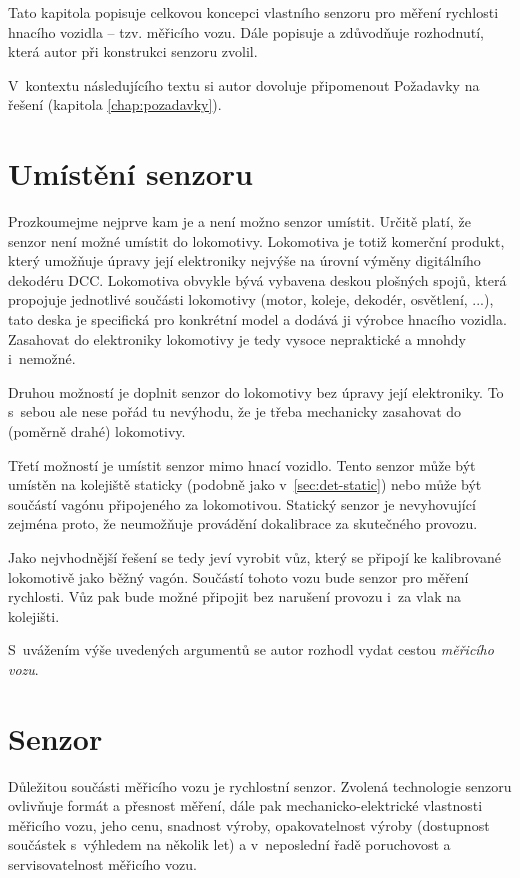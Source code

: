 Tato kapitola popisuje celkovou koncepci vlastního senzoru pro měření
rychlosti hnacího vozidla -- tzv. měřicího vozu. Dále popisuje
a zdůvodňuje rozhodnutí, která autor při konstrukci senzoru zvolil.

V~kontextu následujícího textu si autor dovoluje připomenout Požadavky
na řešení (kapitola \ref{chap:pozadavky}).

\section{Umístění senzoru}
\label{sec:wsm-senzor-umisteni}

Prozkoumejme nejprve kam je a není možno senzor umístit. Určitě platí, že
senzor není možné umístit do lokomotivy. Lokomotiva je totiž komerční produkt,
který umožňuje úpravy její elektroniky nejvýše na úrovní výměny digitálního
dekodéru DCC. Lokomotiva obvykle bývá vybavena deskou plošných spojů, která
propojuje jednotlivé součásti lokomotivy (motor, koleje, dekodér, osvětlení,
...), tato deska je specifická pro konkrétní model a dodává ji výrobce hnacího
vozidla. Zasahovat do elektroniky lokomotivy je tedy vysoce nepraktické a
mnohdy i~nemožné.

Druhou možností je doplnit senzor do lokomotivy bez úpravy její elektroniky.
To s~sebou ale nese pořád tu nevýhodu, že je třeba mechanicky zasahovat do
(poměrně drahé) lokomotivy.

Třetí možností je umístit senzor mimo hnací vozidlo. Tento senzor může být
umístěn na kolejiště staticky (podobně jako v~\ref{sec:det-static}) nebo může
být součástí vagónu připojeného za lokomotivou. Statický senzor je nevyhovující
zejména proto, že neumožňuje provádění dokalibrace za skutečného provozu.

Jako nejvhodnější řešení se tedy jeví vyrobit vůz, který se připojí ke kalibrované
lokomotivě jako běžný vagón. Součástí tohoto vozu bude senzor pro měření
rychlosti. Vůz pak bude možné připojit bez narušení provozu i~za vlak na
 kolejišti.

S~uvážením výše uvedených argumentů se autor rozhodl vydat cestou
\textit{měřicího vozu}.

\section{Senzor}
\label{sec:wsm-senzor}

Důležitou součásti měřicího vozu je rychlostní senzor. Zvolená technologie
senzoru ovlivňuje formát a přesnost měření, dále pak mechanicko-elektrické
vlastnosti měřicího vozu, jeho cenu, snadnost výroby, opakovatelnost výroby
(dostupnost součástek s~výhledem na několik let) a v~neposlední řadě
poruchovost a servisovatelnost měřicího vozu.

